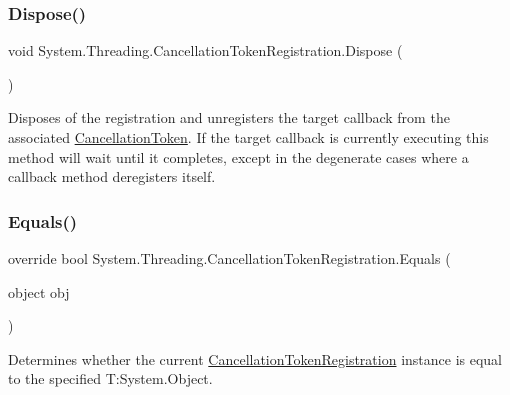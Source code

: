 \subsubsection{\texorpdfstring{Dispose()}{Dispose()}}
{\footnotesize\ttfamily void System.\+Threading.\+Cancellation\+Token\+Registration.\+Dispose (\begin{DoxyParamCaption}{ }\end{DoxyParamCaption})\hspace{0.3cm}{\ttfamily [inline]}}



Disposes of the registration and unregisters the target callback from the associated \hyperlink{}{Cancellation\+Token}. If the target callback is currently executing this method will wait until it completes, except in the degenerate cases where a callback method deregisters itself. 

\mbox{\label{struct_system_1_1_threading_1_1_cancellation_token_registration_afd9c7e03354397c9b45710805cff2c98}} 
\subsubsection{\texorpdfstring{Equals()}{Equals()}\hspace{0.1cm}{\footnotesize\ttfamily [1/2]}}
{\footnotesize\ttfamily override bool System.\+Threading.\+Cancellation\+Token\+Registration.\+Equals (\begin{DoxyParamCaption}\item[{object}]{obj }\end{DoxyParamCaption})\hspace{0.3cm}{\ttfamily [inline]}}



Determines whether the current \hyperlink{}{Cancellation\+Token\+Registration} instance is equal to the specified T\+:\+System.\+Object. 


